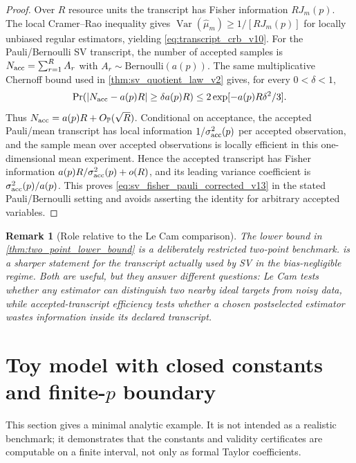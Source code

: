 \documentclass[11pt]{article}
\newtheorem{remark}{Remark}
\newcommand{\Var}{\operatorname{Var}}
\newcommand{\1}{\mathbf{1}}
\newcommand{\abs}[1]{\left\lvert #1 \right\rvert}
\begin{document}
\begin{proof}
Over \(R\) resource units the transcript has Fisher information \(R J_m(p)\).  The local Cramer--Rao inequality gives \(\Var(\widehat\mu_m)\ge 1/[R J_m(p)]\) for locally unbiased regular estimators, yielding \cref{eq:transcript_crb_v10}.  For the Pauli/Bernoulli SV transcript, the number of accepted samples is \(N_{\rm acc}=\sum_{r=1}^R A_r\) with \(A_r\sim\mathrm{Bernoulli}(a(p))\).  The same multiplicative Chernoff bound used in \cref{thm:sv_quotient_law_v2} gives, for every \(0<\delta<1\),
\begin{equation}
    \Pr\!\left(\abs{N_{\rm acc}-a(p)R}\ge \delta a(p)R\right)
    \le 2\exp[-a(p)R\delta^2/3].
\end{equation}
Thus \(N_{\rm acc}=a(p)R+O_{\mathbb P}(\sqrt{R})\).  Conditional on acceptance, the accepted Pauli/mean transcript has local information \(1/\sigma_{\rm acc}^2(p)\) per accepted observation, and the sample mean over accepted observations is locally efficient in this one-dimensional mean experiment.  Hence the accepted transcript has Fisher information \(a(p)R/\sigma_{\rm acc}^2(p)+o(R)\), and its leading variance coefficient is \(\sigma_{\rm acc}^2(p)/a(p)\).  This proves \cref{eq:sv_fisher_pauli_corrected_v13} in the stated Pauli/Bernoulli setting and avoids asserting the identity for arbitrary accepted variables.
\end{proof}

\begin{remark}[Role relative to the Le Cam comparison]
\label{rem:accepted_transcript_vs_lecam_v10}
The lower bound in \cref{thm:two_point_lower_bound} is a deliberately restricted two-point benchmark.   is a sharper statement for the transcript actually used by SV in the bias-negligible regime.  Both are useful, but they answer different questions: Le Cam tests whether any estimator can distinguish two nearby ideal targets from noisy data, while accepted-transcript efficiency tests whether a chosen postselected estimator wastes information inside its declared transcript.
\end{remark}

\section{Toy model with closed constants and finite-\texorpdfstring{$p$}{p} boundary}
\label{sec:toy_model_v4}

This section gives a minimal analytic example.  It is not intended as a realistic benchmark; it demonstrates that the constants and validity certificates are computable on a finite interval, not only as formal Taylor coefficients.
\end{document}
